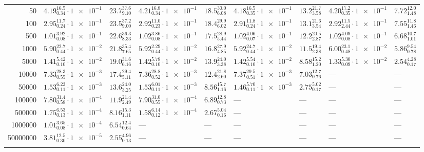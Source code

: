 \begin{table*}
\begin{tabular}{r|ll|ll|ll|ll}
    \rule{0pt}{2.6ex}\num{50}       & $4.19_{0.34}^{16.5}\cdot \num{1e-1}$ & $23.7_{9.10}^{37.6}$ & $4.21_{0.34}^{16.8}\cdot \num{1e-1}$ & $18.5_{6.08}^{30.0}$ & $4.18_{0.35}^{16.5}\cdot \num{1e-1}$ & $13.2_{3.58}^{21.7}$ & $4.20_{0.35}^{17.2}\cdot \num{1e-1}$ & $7.72_{1.48}^{12.0}$ \\
    \rule{0pt}{2.6ex}\num{100}      & $2.95_{0.24}^{11.7}\cdot \num{1e-1}$ & $23.5_{9.00}^{37.2}$ & $2.92_{0.23}^{11.0}\cdot \num{1e-1}$ & $18.4_{6.02}^{29.9}$ & $2.91_{0.24}^{11.8}\cdot \num{1e-1}$ & $13.1_{3.54}^{21.6}$ & $2.92_{2.44}^{11.5}\cdot \num{1e-1}$ & $7.55_{1.46}^{11.8}$ \\
    \rule{0pt}{2.6ex}\num{500}      & $1.01_{0.08}^{3.92}\cdot \num{1e-1}$ & $22.6_{8.33}^{36.3}$ & $1.02_{0.08}^{3.86}\cdot \num{1e-1}$ & $17.5_{5.44}^{28.9}$ & $1.02_{0.07}^{4.06}\cdot \num{1e-1}$ & $12.2_{2.87}^{20.5}$ & $1.02_{0.08}^{4.09}\cdot \num{1e-1}$ & $6.68_{1.01}^{10.7}$ \\
    \rule{0pt}{2.6ex}\num{1000}     & $5.90_{0.44}^{22.7}\cdot \num{1e-2}$ & $21.8_{7.65}^{35.4}$ & $5.92_{0.44}^{2.29}\cdot \num{1e-2}$ & $16.8_{4.85}^{27.9}$ & $5.92_{0.44}^{24.7}\cdot \num{1e-2}$ & $11.5_{2.38}^{19.4}$ & $6.00_{0.48}^{23.1}\cdot \num{1e-2}$ & $5.86_{0.78}^{9.54}$ \\
    \rule{0pt}{2.6ex}\num{5000}     & $1.41_{0.10}^{5.42}\cdot \num{1e-2}$ & $19.0_{6.16}^{31.6}$ & $1.42_{0.10}^{5.78}\cdot \num{1e-2}$ & $13.9_{3.38}^{24.0}$ & $1.42_{0.10}^{5.54}\cdot \num{1e-2}$ & $8.58_{1.20}^{15.2}$ & $1.33_{0.09}^{5.30}\cdot \num{1e-2}$ & $2.54_{0.17}^{4.28}$ \\
    \rule{0pt}{2.6ex}\num{10000}    & $7.33_{0.55}^{28.3}\cdot \num{1e-3}$ & $17.4_{5.11}^{29.4}$ & $7.36_{0.52}^{28.8}\cdot \num{1e-3}$ & $12.4_{2.60}^{21.8}$ & $7.37_{0.51}^{29.5}\cdot \num{1e-3}$ & $7.03_{0.76}^{12.7}$ & --- & --- \\
    \rule{0pt}{2.6ex}\num{50000}    & $1.53_{0.11}^{6.23}\cdot \num{1e-3}$ & $13.6_{3.25}^{24.0}$ & $1.53_{0.11}^{6.01}\cdot \num{1e-3}$ & $8.56_{1.16}^{15.7}$ & $1.46_{0.11}^{5.70}\cdot \num{1e-3}$ & $2.75_{0.17}^{5.02}$ & --- & --- \\
    \rule{0pt}{2.6ex}\num{100000}   & $7.80_{0.58}^{31.4}\cdot \num{1e-4}$ & $11.9_{2.49}^{21.4}$ & $7.90_{0.55}^{31.0}\cdot \num{1e-4}$ & $6.89_{0.73}^{12.8}$ & --- & --- & --- & --- \\
    \rule{0pt}{2.6ex}\num{500000}   & $1.75_{0.13}^{6.53}\cdot \num{1e-4}$ & $8.16_{1.11}^{15.3}$ & $1.58_{0.12}^{6.14}\cdot \num{1e-4}$ & $2.67_{0.16}^{5.04}$ & --- & --- & --- & --- \\
    \rule{0pt}{2.6ex}\num{1000000}  & $1.01_{0.08}^{3.65}\cdot \num{1e-4}$ & $6.54_{0.64}^{12.4}$ & --- & --- & --- & --- & --- & --- \\
    \rule{0pt}{2.6ex}\num{50000000} & $3.81_{0.30}^{12.5}\cdot \num{1e-5}$ & $2.55_{0.13}^{4.96}$ & --- & --- & --- & --- & --- & --- \\
    \noalign{\smallskip}\hline
    \end{tabular}
    \end{table*}

\printbibliography




